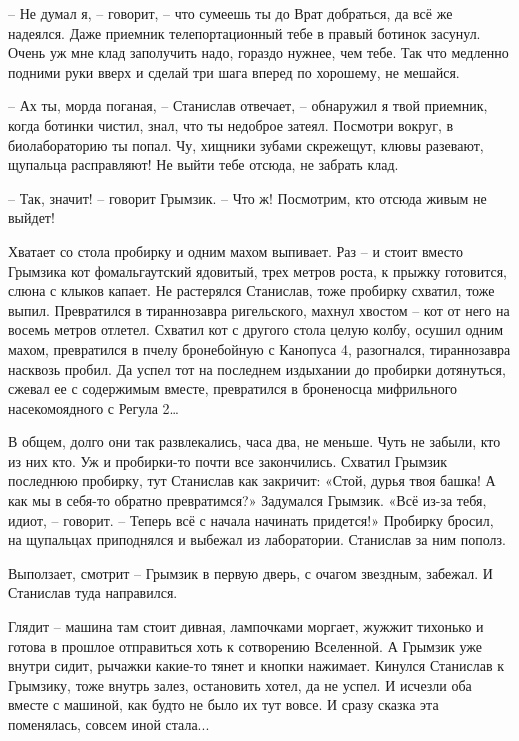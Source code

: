 \documentclass[ebook,oneside,final,openright]{memoir}
\begin{document}
\par
– Не думал я, – говорит, – что сумеешь ты до Врат добраться, да всё же надеялся. Даже приемник телепортационный тебе в правый ботинок засунул. Очень уж мне клад заполучить надо, гораздо нужнее, чем тебе. Так что медленно подними руки вверх и сделай три шага вперед по хорошему, не мешайся.\par
– Ах ты, морда поганая, – Станислав отвечает, – обнаружил я твой приемник, когда ботинки чистил, знал, что ты недоброе затеял. Посмотри вокруг, в биолабораторию ты попал. Чу, хищники зубами скрежещут, клювы разевают, щупальца расправляют! Не выйти тебе отсюда, не забрать клад.\par
– Так, значит! – говорит Грымзик. – Что ж! Посмотрим, кто отсюда живым не выйдет!\par
\par
Хватает со стола пробирку и одним махом выпивает. Раз – и стоит вместо Грымзика кот фомальгаутский ядовитый, трех метров роста, к прыжку готовится, слюна с клыков капает. Не растерялся Станислав, тоже пробирку схватил, тоже выпил. Превратился в тираннозавра ригельского, махнул хвостом – кот от него на восемь метров отлетел. Схватил кот с другого стола целую колбу, осушил одним махом, превратился в пчелу бронебойную с Канопуса 4, разогнался, тираннозавра насквозь пробил. Да успел тот на последнем издыхании до пробирки дотянуться, сжевал ее с содержимым вместе, превратился в броненосца мифрильного насекомоядного с Регула 2…\par
\par
В общем, долго они так развлекались, часа два, не меньше. Чуть не забыли, кто из них кто. Уж и пробирки-то почти все закончились. Схватил Грымзик последнюю пробирку, тут Станислав как закричит: «Стой, дурья твоя башка! А как мы в себя-то обратно превратимся?» Задумался Грымзик. «Всё из-за тебя, идиот, – говорит. – Теперь всё с начала начинать придется!» Пробирку бросил, на щупальцах приподнялся и выбежал из лаборатории. Станислав за ним пополз.\par
\par
Выползает, смотрит – Грымзик в первую дверь, с очагом звездным, забежал. И Станислав туда направился.\par
\par
Глядит – машина там стоит дивная, лампочками моргает, жужжит тихонько и готова в прошлое отправиться хоть к сотворению Вселенной. А Грымзик уже внутри сидит, рычажки какие-то тянет и кнопки нажимает. Кинулся Станислав к Грымзику, тоже внутрь залез, остановить хотел, да не успел. И исчезли оба вместе с машиной, как будто не было их тут вовсе. И сразу сказка эта поменялась, совсем иной стала...\par
\end{document}
